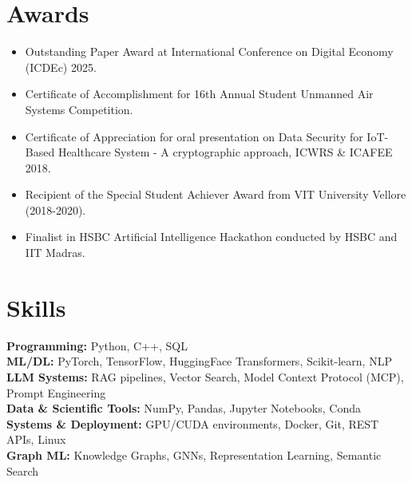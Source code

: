 \documentclass[letterpaper,11pt]{article}
\newcommand{\resumeItem}[1]{
  \item\small{
    {#1 \vspace{-2pt}}
  }
}
\newcommand{\resumeItemListStart}{\begin{itemize}}
\newcommand{\resumeItemListEnd}{\end{itemize}\vspace{-5pt}}
\begin{document}
\section{Awards}
\begin{justify}
\resumeItemListStart
\resumeItem{Outstanding Paper Award at International Conference on Digital Economy (ICDEc) 2025.}
\resumeItem{Certificate of Accomplishment for 16th Annual Student Unmanned Air Systems Competition. }
\resumeItem{Certificate of Appreciation for oral presentation on Data Security for IoT-Based Healthcare System - A cryptographic approach, ICWRS \& ICAFEE 2018.} 
\resumeItem{Recipient of the Special Student Achiever Award from VIT University Vellore (2018-2020).}
\resumeItem{Finalist in HSBC Artificial Intelligence Hackathon conducted by HSBC and IIT Madras.}
\resumeItemListEnd
\end{justify}
\section{Skills}
\begin{itemize}[leftmargin=0.15in, label={}]
    \small{\item{
    \textbf{Programming:} Python, C++, SQL \\
    \textbf{ML/DL:} PyTorch, TensorFlow, HuggingFace Transformers, Scikit-learn, NLP \\
    \textbf{LLM Systems:} RAG pipelines, Vector Search, Model Context Protocol (MCP), Prompt Engineering \\
    \textbf{Data \& Scientific Tools:} NumPy, Pandas, Jupyter Notebooks, Conda \\
    \textbf{Systems \& Deployment:} GPU/CUDA environments, Docker, Git, REST APIs, Linux \\
    \textbf{Graph ML:} Knowledge Graphs, GNNs, Representation Learning, Semantic Search
    }}
\end{itemize}
\end{document}
